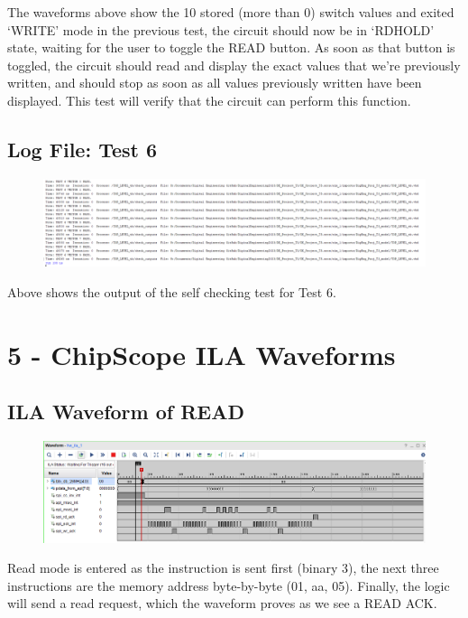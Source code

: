 \documentclass[11pt]{report}
\begin{document}
The waveforms above show  the 10 stored (more than 0) switch values and exited `WRITE' mode in the previous test, the circuit should now be in `RDHOLD' state, waiting for the user to toggle the READ button. As soon as that button is toggled, the circuit should read and display the exact values that we're previously written, and should stop as soon as all values previously written have been displayed. This test will verify that the circuit can perform this function.

\subsection*{Log File: Test 6}
\begin{figure}[H]
    \includegraphics[width=\columnwidth]{Assets/Test6Console.PNG}
\end{figure}

Above shows the output of the self checking test for Test 6.

\section*{5 - ChipScope ILA Waveforms}

\subsection*{ILA Waveform of READ}
\begin{figure}[H]
    \includegraphics[width=\columnwidth]{Assets/ILA_read.PNG}
\end{figure}

Read mode is entered as the instruction is sent first (binary 3), the next three instructions are the memory address byte-by-byte (01, aa, 05). Finally, the logic will send a read request, which the waveform proves as we see a READ ACK.
\end{document}
